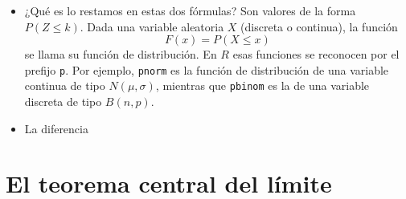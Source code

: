 \begin{itemize}
       \item ¿Qué es lo restamos en estas dos fórmulas? Son valores de la forma $P(Z\leq k)$. Dada una variable aleatoria $X$ (discreta o continua), la función
       \[F(x)=P(X\leq x)\]
       se llama su {\sf función de distribución}. En $R$ esas funciones se reconocen por el prefijo {\tt p}. Por ejemplo, {\tt pnorm} es la función de distribución de una variable continua de tipo $N(\mu,\sigma)$, mientras que {\tt pbinom} es la de una variable discreta de tipo $B(n,p)$.

       \item La diferencia

\end{itemize}

\section{El teorema central del límite}\label{sec:teoremaCentralLimitePrimeraVersion}

